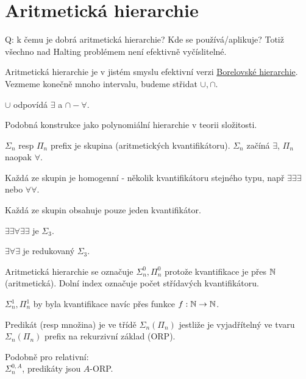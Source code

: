 \section{\texorpdfstring{Aritmetická hierarchie}{Aritmetická hierarchie}}
\vspace{5mm}
\large

Q: k čemu je dobrá aritmetická hierarchie? Kde se používá/aplikuje? Totiž všechno nad Halting problémem není efektivně vyčíslitelné.

\begin{note}
	Aritmetická hierarchie je v jistém smyslu efektivní verzi \href{https://en.wikipedia.org/wiki/Borel_hierarchy}{Borelovské hierarchie}. Vezmeme konečně mnoho intervalu, budeme střidat $\cup, \cap$.

	$\cup$ odpovídá $\exists$ a $\cap - \forall$.
\end{note}

\begin{note}
	Podobná konstrukce jako polynomiální hierarchie v teorii složitosti.
\end{note}

\begin{definition}[$\Sigma_n, \Pi_n$]
	$\Sigma_n$ resp $\Pi_n$ prefix je skupina (aritmetických kvantifikátoru). $\Sigma_n$ začíná $\exists$, $\Pi_n$ naopak $\forall$.

	Každá ze skupin je homogenní - několik kvantifikátoru stejného typu, např $\exists\exists\exists$ nebo $\forall\forall$.
\end{definition}

\begin{definition}
	Každá ze skupin obsahuje pouze jeden kvantifikátor.
\end{definition}

\begin{example}
	$\exists\exists\forall\exists\exists$ je $\Sigma_3$.

	$\exists\forall\exists$ je redukovaný $\Sigma_3$.
\end{example}

\begin{note}
	Aritmetická hierarchie se označuje $\Sigma_n^0, \Pi_n^0$ protože kvantifikace je přes $\operatorname{\mathbb{N}}$ (aritmetická).
	Dolní index označuje počet střídavých kvantifikátoru.

	$\Sigma_n^1, \Pi_n^1$ by byla kvantifikace navíc přes funkce $f:\operatorname{\mathbb{N}} \to \operatorname{\mathbb{N}}$.
\end{note}

\begin{definition}
	Predikát (resp množina) je ve třídě $\Sigma_n (\Pi_n)$ jestliže je vyjadřítelný ve tvaru $\Sigma_n (\Pi_n)$ prefix na rekurzivní základ (ORP).

	Podobně pro relativní: \\
	$ \Sigma_n^{0, A}$, predikáty jsou $A$-ORP.
\end{definition}

